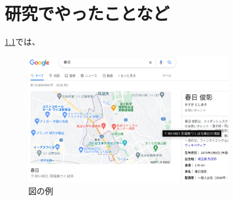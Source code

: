 \chapter{研究でやったことなど}

\ref{fig:sample}では、

\begin{figure}
	\centering
	\includegraphics[width=0.8\textwidth]{figures/sample.eps}
	\caption{図の例}
	\label{fig:sample}
\end{figure}
